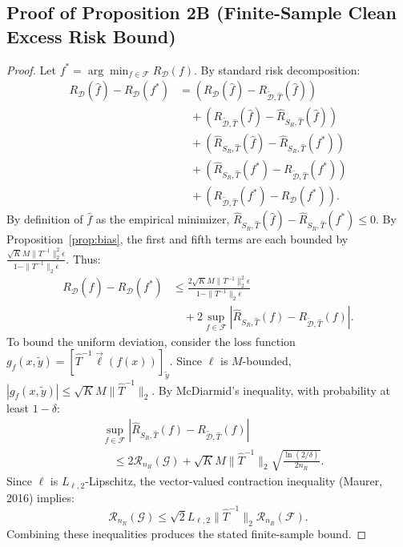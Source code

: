 \documentclass[journal]{IEEEtran}
\theoremstyle{definition}
\begin{document}
\subsection{Proof of Proposition 2B (Finite-Sample Clean Excess Risk Bound)}
\label{sec:proof_excess_risk}
\begin{proof}
Let $f^* = \arg\min_{f \in \mathcal{F}} R_{\mathcal{D}}(f)$. By standard risk decomposition:
\begin{align}
R_{\mathcal{D}}(\hat{f}) - R_{\mathcal{D}}(f^*) &= \left( R_{\mathcal{D}}(\hat{f}) - R_{\tilde{\mathcal{D}}, \hat{T}}(\hat{f}) \right) \nonumber \\
&\quad + \left( R_{\tilde{\mathcal{D}}, \hat{T}}(\hat{f}) - \hat{R}_{S_R, \hat{T}}(\hat{f}) \right) \nonumber \\
&\quad + \left( \hat{R}_{S_R, \hat{T}}(\hat{f}) - \hat{R}_{S_R, \hat{T}}(f^*) \right) \nonumber \\
&\quad + \left( \hat{R}_{S_R, \hat{T}}(f^*) - R_{\tilde{\mathcal{D}}, \hat{T}}(f^*) \right) \nonumber \\
&\quad + \left( R_{\tilde{\mathcal{D}}, \hat{T}}(f^*) - R_{\mathcal{D}}(f^*) \right).
\end{align}
By definition of $\hat{f}$ as the empirical minimizer, $\hat{R}_{S_R, \hat{T}}(\hat{f}) - \hat{R}_{S_R, \hat{T}}(f^*) \le 0$. By Proposition~\ref{prop:bias}, the first and fifth terms are each bounded by $\frac{\sqrt{K} M \|T^{-1}\|_2^2 \epsilon}{1 - \|T^{-1}\|_2 \epsilon}$. Thus:
\begin{align}
R_{\mathcal{D}}(\hat{f}) - R_{\mathcal{D}}(f^*) &\le \frac{2 \sqrt{K} M \|T^{-1}\|_2^2 \epsilon}{1 - \|T^{-1}\|_2 \epsilon} \nonumber \\
&\quad + 2 \sup_{f \in \mathcal{F}} \left| \hat{R}_{S_R, \hat{T}}(f) - R_{\tilde{\mathcal{D}}, \hat{T}}(f) \right|.
\end{align}
To bound the uniform deviation, consider the loss function $g_f(x, \tilde{y}) = [\hat{T}^{-1} \vec{\ell}(f(x))]_{\tilde{y}}$. Since $\ell$ is $M$-bounded, $|g_f(x, \tilde{y})| \le \sqrt{K} M \|\hat{T}^{-1}\|_2$. By McDiarmid's inequality, with probability at least $1 - \delta$:
\begin{align}
&\sup_{f \in \mathcal{F}} \left| \hat{R}_{S_R, \hat{T}}(f) - R_{\tilde{\mathcal{D}}, \hat{T}}(f) \right| \nonumber \\
&\quad \le 2 \mathcal{R}_{n_R}(\mathcal{G}) + \sqrt{K} M \|\hat{T}^{-1}\|_2 \sqrt{\frac{\ln(2/\delta)}{2 n_R}}.
\end{align}
Since $\ell$ is $L_{\ell, 2}$-Lipschitz, the vector-valued contraction inequality (Maurer, 2016) implies:
\begin{equation}
\mathcal{R}_{n_R}(\mathcal{G}) \le \sqrt{2} L_{\ell, 2} \|\hat{T}^{-1}\|_2 \mathcal{R}_{n_R}(\mathcal{F}).
\end{equation}
Combining these inequalities produces the stated finite-sample bound.
\end{proof}
\end{document}
